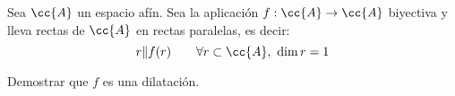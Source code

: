 \begin{ejercicio}
    Sea $\cc{A}$ un espacio afín. Sea la aplicación $f:\cc{A}\to \cc{A}$ biyectiva y lleva rectas de $\cc{A}$ en rectas paralelas, es decir:
    \begin{equation*}
        r\|f(r) \qquad \forall r\subset \cc{A},~ \dim r =1
    \end{equation*}

    Demostrar que $f$ es una dilatación.
\end{ejercicio}